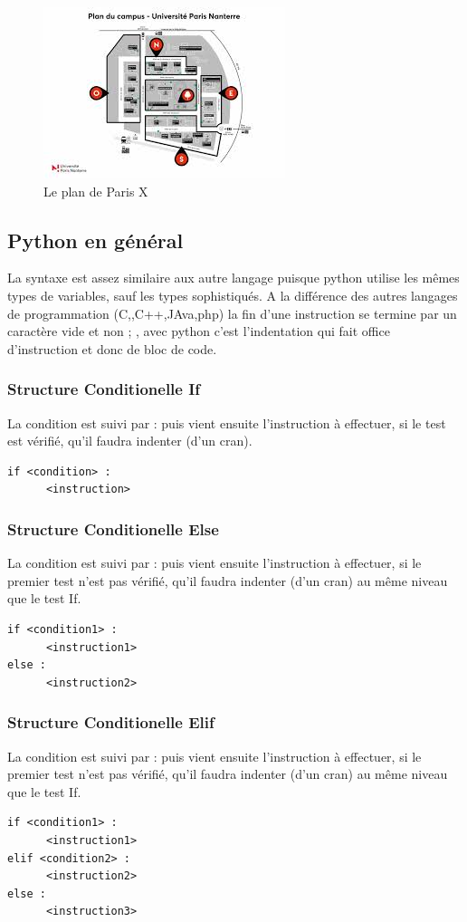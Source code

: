 \documentclass[a4paper, 12pt, twoside]{article}
\begin{document}
{{{{{\begin{center}
\begin{figure}[h!]
\centering
\includegraphics[scale=1.3]{plan.jpeg}
\caption{Le plan de Paris X}
\end{figure}
\end{center}
\subsection{Python en général}
La syntaxe est assez similaire aux autre langage puisque python utilise les mêmes types de variables, sauf les types sophistiqués. A la différence des autres langages de programmation (C,,C++,\textsf{JA}va,php) la fin d'une instruction se termine par un caractère vide
et non  ; , avec python c'est l'indentation qui fait office d'instruction et donc de bloc de code.
\subsubsection{ Structure Conditionelle If }
La condition est suivi par  :  puis vient ensuite l'instruction à effectuer, si le test est vérifié, qu'il faudra indenter (d'un cran).
\begin{verbatim}
if <condition> :
      <instruction>
\end{verbatim}
\subsubsection{ Structure Conditionelle Else}
La condition est suivi par  :  puis vient ensuite l'instruction à effectuer, si le premier test n'est pas vérifié, qu'il faudra indenter (d'un cran) au même niveau que le test If.
\begin{verbatim}
if <condition1> :
      <instruction1>
else :
      <instruction2>
\end{verbatim}
\subsubsection{ Structure Conditionelle Elif }
La condition est suivi par  :  puis vient ensuite l'instruction à effectuer, si le premier test n'est pas vérifié, qu'il faudra indenter (d'un cran) au même niveau que le test If.
\begin{verbatim}
if <condition1> :
      <instruction1>
elif <condition2> :
      <instruction2>
else : 
      <instruction3>
\end{verbatim}
}}}}}
\end{document}
